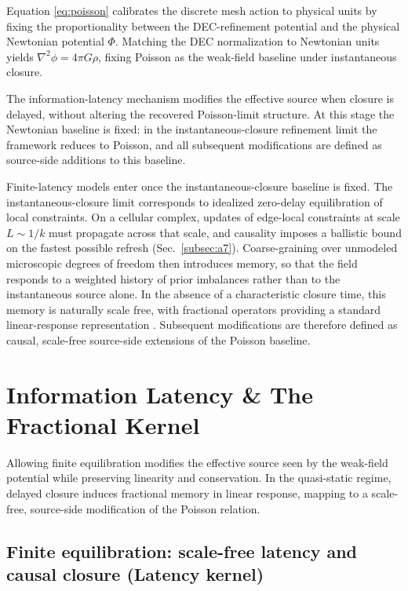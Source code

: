\documentclass[entropy,article,submit,pdftex,moreauthors]{Definitions/mdpi}
\begin{document}
Equation \eqref{eq:poisson} calibrates the discrete mesh action to physical units by fixing the proportionality between the DEC-refinement potential and the physical Newtonian potential \(\Phi\). Matching the DEC normalization to Newtonian units yields $\nabla^2 \phi = 4 \pi G \rho$, fixing Poisson as the weak-field baseline under instantaneous closure.

The information-latency mechanism modifies the effective source when closure is delayed, without altering the recovered Poisson-limit structure. At this stage the Newtonian baseline is fixed: in the instantaneous-closure refinement limit the framework reduces to Poisson, and all subsequent modifications are defined as source-side additions to this baseline.

Finite-latency models enter once the instantaneous-closure baseline is fixed. The instantaneous-closure limit corresponds to idealized zero-delay equilibration of local constraints. On a cellular complex, updates of edge-local constraints at scale \(L\sim 1/k\) must propagate across that scale, and causality imposes a ballistic bound on the fastest possible refresh (Sec.~\ref{subsec:a7}). Coarse-graining over unmodeled microscopic degrees of freedom then introduces memory, so that the field responds to a weighted history of prior imbalances rather than to the instantaneous source alone. In the absence of a characteristic closure time, this memory is naturally scale free, with fractional operators providing a standard linear-response representation \cite{MetzlerKlafter2000,Mainardi2010}. Subsequent modifications are therefore defined as causal, scale-free source-side extensions of the Poisson baseline.

\section{Information Latency \& The Fractional Kernel}
\label{sec:latency}

Allowing finite equilibration modifies the effective source seen by the weak-field potential while preserving linearity and conservation. In the quasi-static regime, delayed closure induces fractional memory in linear response, mapping to a scale-free, source-side modification of the Poisson relation.

\subsection{Finite equilibration: scale-free latency and causal closure (Latency kernel)}
\label{subsec:ilg_mechanism}
\end{document}

